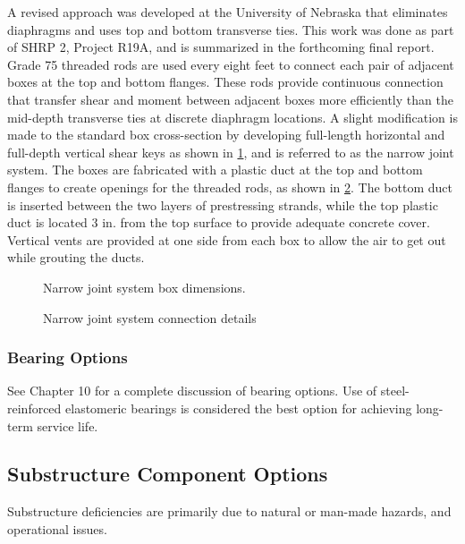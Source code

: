 A revised approach was developed at the University of Nebraska that eliminates diaphragms and uses top and
bottom transverse ties. This work was done as part of SHRP 2, Project R19A, and is summarized in the forthcoming
final report. Grade 75 threaded rods are used every eight feet to connect each pair of adjacent boxes at the top and
bottom flanges. These rods provide continuous connection that transfer shear and moment between adjacent boxes
more efficiently than the mid-depth transverse ties at discrete diaphragm locations. A slight modification is made to
the standard box cross-section by developing full-length horizontal and full-depth vertical shear keys as shown in
\cref{fig:narrow-joint-system-box}, and is referred to as the narrow joint system. The boxes are fabricated with a plastic duct at the top and
bottom flanges to create openings for the threaded rods, as shown in \cref{fig:narrow-joint-connection-details}. The bottom duct is inserted
between the two layers of prestressing strands, while the top plastic duct is located 3 in. from the top surface to provide adequate concrete cover. Vertical vents are provided at one side from each box to allow the air to get out
while grouting the ducts.

\begin{figure}
  \caption{Narrow joint system box dimensions.}
  \label{fig:narrow-joint-system-box}
\end{figure}

\begin{figure}
  \caption{Narrow joint system connection details}
  \label{fig:narrow-joint-connection-details}
\end{figure}

\subsubsection{Bearing Options}
See Chapter 10 for a complete discussion of bearing options. Use of steel-reinforced elastomeric bearings is considered the best option for achieving long-term service life.

\subsection{Substructure Component Options}
Substructure deficiencies are primarily due to natural or man-made hazards, and operational issues.

